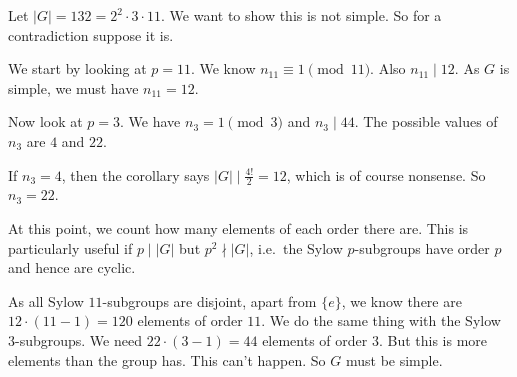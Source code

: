 \documentclass[a4paper]{article}
\begin{document}
\begin{eg}
  Let $|G| = 132 = 2^2 \cdot 3 \cdot 11$. We want to show this is not simple. So for a contradiction suppose it is.

  We start by looking at $p = 11$. We know $n_{11} \equiv 1 \pmod {11}$. Also $n_{11} \mid 12$. As $G$ is simple, we must have $n_{11} = 12$.

  Now look at $p = 3$. We have $n_3 = 1 \pmod 3$ and $n_3 \mid 44$. The possible values of $n_3$ are $4$ and $22$.

  If $n_3 = 4$, then the corollary says $|G| \mid \frac{4!}{2} = 12$, which is of course nonsense. So $n_3 = 22$.

  At this point, we count how many elements of each order there are. This is particularly useful if $p \mid |G|$ but $p^2 \nmid |G|$, i.e.\ the Sylow $p$-subgroups have order $p$ and hence are cyclic.

  As all Sylow $11$-subgroups are disjoint, apart from $\{e\}$, we know there are $12 \cdot (11 - 1) = 120$ elements of order $11$. We do the same thing with the Sylow $3$-subgroups. We need $22 \cdot (3 - 1) = 44$ elements of order $3$. But this is more elements than the group has. This can't happen. So $G$ must be simple.
\end{eg}
\end{document}
